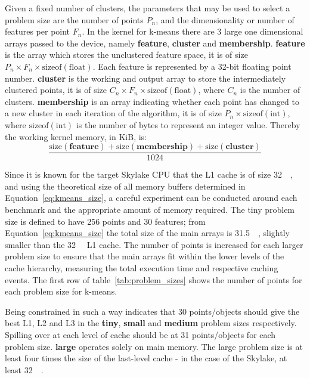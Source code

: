 \documentclass[../document.tex]{subfiles}
\begin{document}
Given a fixed number of clusters, the parameters that may be used to select a problem size are the number of points $P_n$, and the dimensionality or number of features per point $F_n$.
In the kernel for k-means there are 3 large one dimensional arrays passed to the device, namely {\bf feature}, {\bf cluster} and {\bf membership}.
{\bf feature} is the array which stores the unclustered feature space, it is of size $P_n \times F_n \times \text{sizeof}\left(\text{float}\right)$.
Each feature is represented by a 32-bit floating point number.
{\bf cluster} is the working and output array to store the intermediately clustered points, it is of size $C_n \times F_n \times \text{sizeof}\left(\text{float}\right)$, where $C_n$ is the number of clusters.
{\bf membership} is an array indicating whether each point has changed to a new cluster in each iteration of the algorithm, it is of size $P_n \times \text{sizeof}\left(\text{int}\right)$, where $\text{sizeof}\left(\text{int}\right)$ is the number of bytes to represent an integer value.
Thereby the working kernel memory, in KiB, is:
\begin{equation}
    \frac{\text{size}\left(\textbf{feature}\right)+\text{size}\left(\textbf{membership}\right)+\text{size}\left(\textbf{cluster}\right)}{1024}
    \label{eq:kmeans_size}
\end{equation}

Since it is known for the target Skylake CPU that the L1 cache is of size \SI{32}{\kibi\byte}, and using the theoretical size of all memory buffers determined in Equation~\ref{eq:kmeans_size}, a careful experiment can be conducted around each benchmark and the appropriate amount of memory required.
The tiny problem size is defined to have 256 points and 30 features; from Equation~\ref{eq:kmeans_size} the total size of the main arrays is \SI{31.5}{\kibi\byte}, slightly smaller than the \SI{32}{\kibi\byte} L1 cache.
The number of points is increased for each larger problem size to ensure that the main arrays fit within the lower levels of the cache hierarchy, measuring the total execution time and respective caching events.
The first row of table~\ref{tab:problem_sizes} shows the number of points for each problem size for k-means.

Being constrained in such a way indicates that 30 points/objects should give the best L1, L2 and L3 in the {\bf tiny}, {\bf small} and {\bf medium} problem sizes respectively.
Spilling over at each level of cache should be at 31 points/objects for each problem size.
{\bf large} operates solely on main memory.
The large problem size is at least four times the size of the last-level cache - in the case of the Skylake, at least \SI{32}{\mebi\byte}. 
\end{document}
